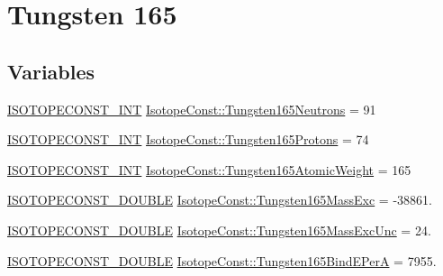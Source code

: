 \hypertarget{group___isotope_const-_tungsten-_w165}{}\section{Tungsten 165}
\label{group___isotope_const-_tungsten-_w165}
\subsection*{Variables}
\begin{DoxyCompactItemize}
\item 
\mbox{\hyperlink{group___isotope_const-_macros_ga5f18360b3e99483a35c32d789e62621c}{I\+S\+O\+T\+O\+P\+E\+C\+O\+N\+S\+T\+\_\+\+I\+NT}} \mbox{\hyperlink{group___isotope_const-_tungsten-_w165_ga9dfba542815fd70dcbc8b08f515cfa61}{Isotope\+Const\+::\+Tungsten165\+Neutrons}} = 91
\item 
\mbox{\hyperlink{group___isotope_const-_macros_ga5f18360b3e99483a35c32d789e62621c}{I\+S\+O\+T\+O\+P\+E\+C\+O\+N\+S\+T\+\_\+\+I\+NT}} \mbox{\hyperlink{group___isotope_const-_tungsten-_w165_ga19b89b5fe0e40f62ae4534e45ea8808a}{Isotope\+Const\+::\+Tungsten165\+Protons}} = 74
\item 
\mbox{\hyperlink{group___isotope_const-_macros_ga5f18360b3e99483a35c32d789e62621c}{I\+S\+O\+T\+O\+P\+E\+C\+O\+N\+S\+T\+\_\+\+I\+NT}} \mbox{\hyperlink{group___isotope_const-_tungsten-_w165_gaa18c85ae4e6484347c0b05c72405b7a4}{Isotope\+Const\+::\+Tungsten165\+Atomic\+Weight}} = 165
\item 
\mbox{\hyperlink{group___isotope_const-_macros_ga8f45a7272ce02c0b4c65c44636ed719a}{I\+S\+O\+T\+O\+P\+E\+C\+O\+N\+S\+T\+\_\+\+D\+O\+U\+B\+LE}} \mbox{\hyperlink{group___isotope_const-_tungsten-_w165_gae74df146ada85b80fc18d752b36d4467}{Isotope\+Const\+::\+Tungsten165\+Mass\+Exc}} = -\/38861.
\item 
\mbox{\hyperlink{group___isotope_const-_macros_ga8f45a7272ce02c0b4c65c44636ed719a}{I\+S\+O\+T\+O\+P\+E\+C\+O\+N\+S\+T\+\_\+\+D\+O\+U\+B\+LE}} \mbox{\hyperlink{group___isotope_const-_tungsten-_w165_gadcdb9a1b4d98416283719b7b3c5f9b6b}{Isotope\+Const\+::\+Tungsten165\+Mass\+Exc\+Unc}} = 24.
\item 
\mbox{\hyperlink{group___isotope_const-_macros_ga8f45a7272ce02c0b4c65c44636ed719a}{I\+S\+O\+T\+O\+P\+E\+C\+O\+N\+S\+T\+\_\+\+D\+O\+U\+B\+LE}} \mbox{\hyperlink{group___isotope_const-_tungsten-_w165_ga1d5a8d93458a8e79d2a82bfa3738d815}{Isotope\+Const\+::\+Tungsten165\+Bind\+E\+PerA}} = 7955.
\item 

\end{DoxyCompactItemize}
